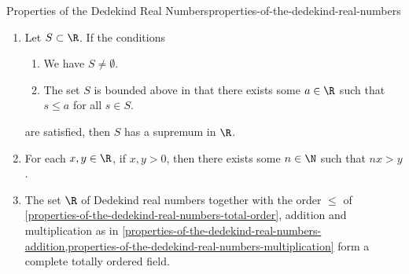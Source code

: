 \begin{proposition}{Properties of the Dedekind Real Numbers}{properties-of-the-dedekind-real-numbers}
\begin{enumerate}
\[\begin{aligned}
                        &\text{such that $r\lt k$}%
                    \end{aligned}%
                \}.%
            \]%
        \item\label{properties-of-the-dedekind-real-numbers-the-dedekind-real-numbers-admit-suprema-of-bounded-subsets}Let $S\subset\R$. If the conditions
            \begin{enumerate}
                \item\label{properties-of-the-dedekind-real-numbers-the-dedekind-real-numbers-admit-suprema-of-bounded-subsets-1}We have $S\neq\emptyset$.
                \item\label{properties-of-the-dedekind-real-numbers-the-dedekind-real-numbers-admit-suprema-of-bounded-subsets-2}The set $S$ is bounded above in that there exists some $a\in\R$ such that $s\leq a$ for all $s\in S$.
            \end{enumerate}
            are satisfied, then $S$ has a supremum in $\R$.
        \item\label{properties-of-the-dedekind-real-numbers-the-archimedean-property}For each $x,y\in\R$, if $x,y\gt0$, then there exists some $n\in\N$ such that $nx\gt y$.
        \item\label{properties-of-the-dedekind-real-numbers-the-bourbaki-real-numbers-form-a-complete-totally-ordered-field}The set $\R$ of Dedekind real numbers together with the order $\leq$ of \cref{properties-of-the-dedekind-real-numbers-total-order}, addition and multiplication as in \cref{properties-of-the-dedekind-real-numbers-addition,properties-of-the-dedekind-real-numbers-multiplication} form a complete totally ordered field.
    \end{enumerate}
\end{proposition}
